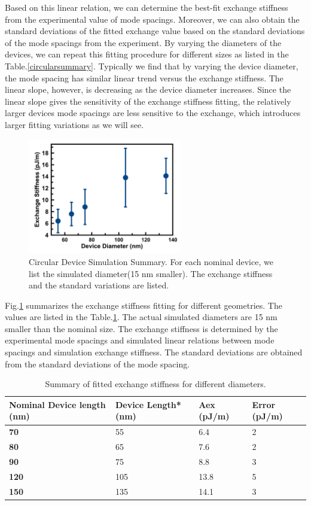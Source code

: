 Based on this linear relation, we can determine the best-fit exchange stiffness from the experimental value of mode spacings. Moreover, we can also obtain the standard deviations of the fitted exchange value based on the standard deviations of the mode spacings from the experiment. By varying the diameters of the devices, we can repeat this fitting procedure for different sizes as listed in the Table.\ref{circularsummary}. Typically we find that by varying the device diameter, the mode spacing has similar linear trend versus the exchange stiffness. The linear slope, however, is decreasing as the device diameter increases. Since the linear slope gives the sensitivity of the exchange stiffness fitting, the relatively larger devices mode spacings are less sensitive to the exchange, which introduces larger fitting variations as we will see.

\begin{figure}[!ht]
  \centering
  \includegraphics[width=0.6\textwidth]{fig/2018/sim/circular_summary}
   \caption{Circular Device Simulation Summary. For each nominal device, we list the simulated diameter(15 nm smaller). The exchange stiffness and the standard variations are listed.}
  \label{fig:circularsummary}
\end{figure}

Fig.\ref{fig:circularsummary} summarizes the exchange stiffness fitting for different geometries. The values are listed in the Table.\ref{cirexsummary}. The actual simulated diameters are 15 nm smaller than the nominal size. The exchange stiffness is determined by the experimental mode spacings and simulated linear relations between mode spacings and simulation exchange stiffness. The standard deviations are obtained from the standard deviations of the mode spacing. 

\begin{table}[]
\centering
\begin{tabular}{|l|l|l|l|}
\hline
\textbf{Nominal Device length (nm)} & \textbf{Device Length* (nm)} & \textbf{Aex (pJ/m)} & \textbf{Error (pJ/m)} \\ \hline
\textbf{70} & 55 & 6.4 & 2 \\ \hline
\textbf{80} & 65 & 7.6 & 2 \\ \hline
\textbf{90} & 75 & 8.8 & 3 \\ \hline
\textbf{120} & 105 & 13.8 & 5 \\ \hline
\textbf{150} & 135 & 14.1 & 3 \\ \hline
\end{tabular}
\caption{Summary of fitted exchange stiffness for different diameters.}
\label{cirexsummary}
\end{table}

